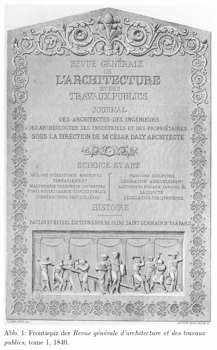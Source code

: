\begin{figure}[htbp]
\centering
\includegraphics{img/wagner-1.jpg}
\caption*{Abb. 1: Frontispiz der \emph{Revue générale d'architecture et
des travaux publics}, tome 1, 1840.}
\end{figure}

